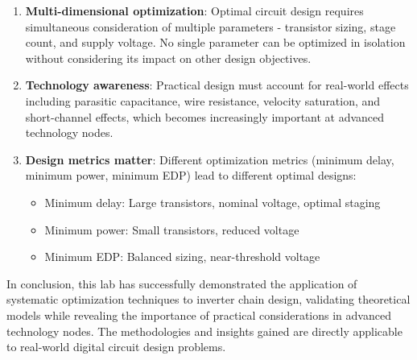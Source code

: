 \documentclass[UTF8,12pt,a4paper]{ctexart}
\begin{document}
\begin{enumerate}
    \item \textbf{Multi-dimensional optimization}: Optimal circuit design requires simultaneous consideration of multiple parameters - transistor sizing, stage count, and supply voltage. No single parameter can be optimized in isolation without considering its impact on other design objectives.
    
    \item \textbf{Technology awareness}: Practical design must account for real-world effects including parasitic capacitance, wire resistance, velocity saturation, and short-channel effects, which becomes increasingly important at advanced technology nodes.
    
    \item \textbf{Design metrics matter}: Different optimization metrics (minimum delay, minimum power, minimum EDP) lead to different optimal designs:
    \begin{itemize}
        \item Minimum delay: Large transistors, nominal voltage, optimal staging
        \item Minimum power: Small transistors, reduced voltage
        \item Minimum EDP: Balanced sizing, near-threshold voltage
    \end{itemize}
\end{enumerate}

In conclusion, this lab has successfully demonstrated the application of systematic optimization techniques to inverter chain design, validating theoretical models while revealing the importance of practical considerations in advanced technology nodes. The methodologies and insights gained are directly applicable to real-world digital circuit design problems.
\end{document}
